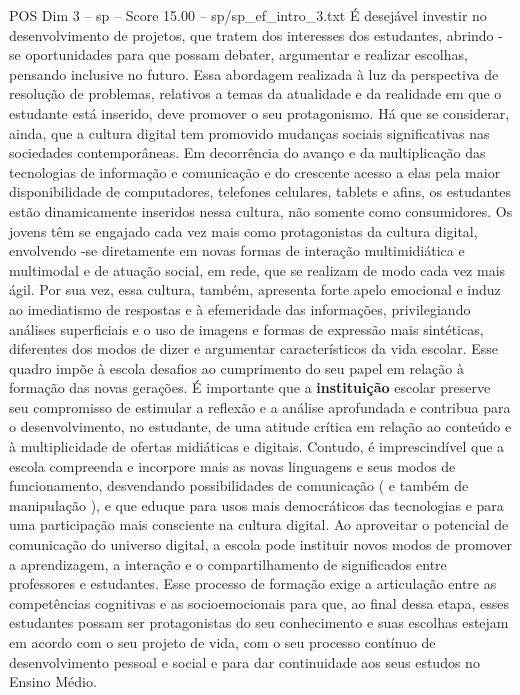 \begin{textsample}{POS Dim 3 – sp – Score 15.00 – sp/sp\_ef\_intro\_3.txt}
É desejável investir no desenvolvimento de projetos, que tratem dos interesses dos estudantes, abrindo -se oportunidades para que possam debater, argumentar e realizar escolhas, pensando inclusive no futuro.
Essa abordagem realizada à luz da perspectiva de resolução de problemas, relativos a temas da atualidade e da realidade em que o estudante está inserido, deve promover o seu protagonismo.
Há que se considerar, ainda, que a cultura digital tem promovido mudanças sociais significativas nas sociedades contemporâneas.
Em decorrência do avanço e da multiplicação das tecnologias de informação e comunicação e do crescente acesso a elas pela maior disponibilidade de computadores, telefones celulares, tablets e afins, os estudantes estão dinamicamente inseridos nessa cultura, não somente como consumidores.
Os jovens têm se engajado cada vez mais como protagonistas da cultura digital, envolvendo -se diretamente em novas formas de interação multimidiática e multimodal e de atuação social, em rede, que se realizam de modo cada vez mais ágil.
Por sua vez, essa cultura, também, apresenta forte apelo emocional e induz ao imediatismo de respostas e à efemeridade das informações, privilegiando análises superficiais e o uso de imagens e formas de expressão mais sintéticas, diferentes dos modos de dizer e argumentar característicos da vida escolar.
Esse quadro impõe à escola desafios ao cumprimento do seu papel em relação à formação das novas gerações.
É importante que a \textbf{instituição} escolar preserve seu compromisso de estimular a reflexão e a análise aprofundada e contribua para o desenvolvimento, no estudante, de uma atitude crítica em relação ao conteúdo e à multiplicidade de ofertas midiáticas e digitais.
Contudo, é imprescindível que a escola compreenda e incorpore mais as novas linguagens e seus modos de funcionamento, desvendando possibilidades de comunicação ( e também de manipulação ), e que eduque para usos mais democráticos das tecnologias e para uma participação mais consciente na cultura digital.
Ao aproveitar o potencial de comunicação do universo digital, a escola pode instituir novos modos de promover a aprendizagem, a interação e o compartilhamento de significados entre professores e estudantes.
Esse processo de formação exige a articulação entre as competências cognitivas e as socioemocionais para que, ao final dessa etapa, esses estudantes possam ser protagonistas do seu conhecimento e suas escolhas estejam em acordo com o seu projeto de vida, com o seu processo contínuo de desenvolvimento pessoal e social e para dar continuidade aos seus estudos no Ensino Médio.

\end{textsample}
